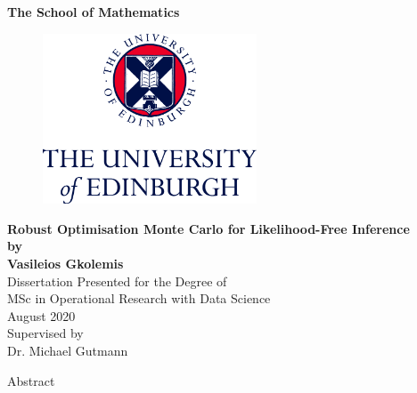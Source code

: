 \documentclass[11pt,twoside]{article}
\numberwithin{Theorem}{section}
\numberwithin{Definition}{section}
\numberwithin{Lemma}{section}
\numberwithin{Algorithm}{section}
\numberwithin{equation}{section}
\begin{document}
\pagestyle{empty}

\begin{titlepage}
\vspace*{.5em}
\center
\textbf{\large{The School of Mathematics}} \\
\vspace*{1em}
\begin{figure}[!h]
\centering
\includegraphics[width=180pt]{images/CentredLogoCMYK.jpg}
\end{figure}
\vspace{2em}
\textbf{\Huge{Robust Optimisation Monte Carlo for Likelihood-Free Inference}}\\[2em]
\textbf{\LARGE{by}}\\
\vspace{2em}
\textbf{\LARGE{Vasileios Gkolemis}}\\
\vspace{6.5em}
\Large{Dissertation Presented for the Degree of\\
MSc in Operational Research with Data Science}\\
\vspace{6.5em}
\Large{August 2020}\\
\vspace{3em}
\Large{Supervised by\\Dr. Michael Gutmann}
\vfill
\end{titlepage}

\cleardoublepage

\begin{center}
\Large{Abstract}
\end{center}


\clearpage
\end{document}
